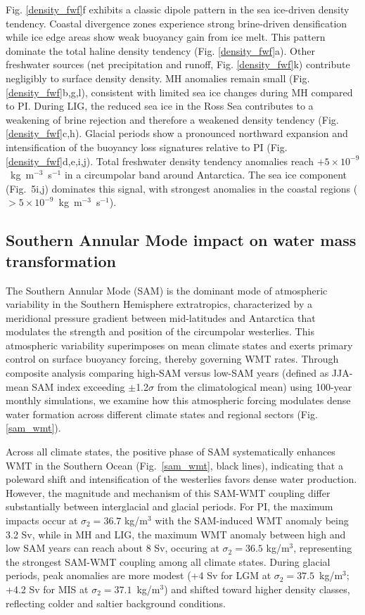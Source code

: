\documentclass[draft]{agujournal2025}
\begin{document}
Fig. \ref{density_fwf}f exhibits a classic dipole pattern in the sea ice-driven density tendency.  Coastal divergence zones experience strong brine-driven densification while ice edge areas show weak buoyancy gain from ice melt. This pattern dominate the total haline density tendency (Fig. \ref{density_fwf}a). Other freshwater sources (net precipitation and runoff,  Fig. \ref{density_fwf}k) contribute negligibly to surface density density.
MH anomalies remain small (Fig. \ref{density_fwf}b,g,l), consistent with limited sea ice changes during MH compared to PI. During LIG, the reduced sea ice in the Ross Sea contributes to a weakening of brine rejection and therefore a weakened density tendency (Fig. \ref{density_fwf}c,h).
Glacial periods show a pronounced northward expansion and intensification of the buoyancy loss signatures relative to PI (Fig. \ref{density_fwf}d,e,i,j). Total freshwater density tendency anomalies reach $+5 \times 10^{-9}$~kg~m$^{-3}$~s$^{-1}$ in a circumpolar band around Antarctica. The sea ice component (Fig.~5i,j) dominates this signal, with strongest anomalies in the coastal regions ($> 5 \times 10^{-9}$~kg~m$^{-3}$~s$^{-1}$).




\subsection{Southern Annular Mode impact on water mass transformation}





The Southern Annular Mode (SAM) is the dominant mode of atmospheric variability in the Southern Hemisphere extratropics, characterized by a meridional pressure gradient between mid-latitudes and Antarctica that modulates the strength and position of the circumpolar westerlies. This atmospheric variability superimposes on mean climate states   and exerts primary control on surface buoyancy forcing, thereby governing WMT rates. Through composite analysis comparing high-SAM versus low-SAM years  (defined as JJA-mean SAM index exceeding $\pm$1.2$\sigma$ from the climatological mean)  using 100-year monthly simulations, we examine how this atmospheric forcing modulates   dense water formation across different climate states and regional sectors  (Fig. \ref{sam_wmt}).

Across all climate states, the positive phase of SAM systematically enhances WMT in the Southern Ocean (Fig.~\ref{sam_wmt}, black lines), indicating that a poleward shift and intensification of the westerlies favors dense water production. However, the magnitude and mechanism of this SAM-WMT coupling differ substantially between interglacial and glacial periods. For PI, the maximum impacts occur at $\sigma_2 = 36.7$ kg/m$^3$ with the SAM-induced WMT anomaly being 3.2 Sv,  while in MH and LIG, the maximum WMT anomaly between high and low SAM years can reach about 8 Sv, occuring at $\sigma_2 = 36.5$ kg/m$^3$, representing the strongest SAM-WMT coupling among all climate states. During glacial periods, peak anomalies are more modest (+4 Sv for LGM at $\sigma_2 = 37.5$~kg/m$^3$; +4.2 Sv for MIS at $\sigma_2 = 37.1$~kg/m$^3$) and shifted  toward higher density classes, reflecting colder and saltier background conditions.
\end{document}

